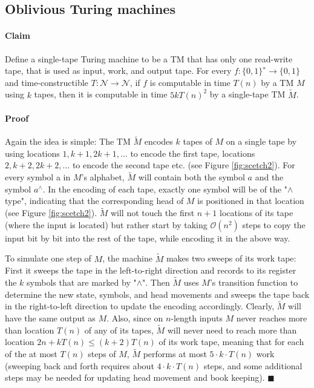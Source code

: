 \documentclass[a4paper,12pt]{article}
\begin{document}
\subsection{Oblivious Turing machines}

\paragraph{Claim}
Define a single-tape Turing machine to be a TM that has only one read-write
tape, that is used as input, work, and output tape. For every $f : \{0, 1\}^{∗} \rightarrow \{0, 1\}$ and
time-constructible $T : \mathcal{N} \rightarrow \mathcal{N}$, if $f$ is computable in time $T(n)$ by a TM $M$ using $k$ tapes,
then it is computable in time $5kT(n)^2$ by a single-tape TM  $\widetilde{M}$.

\paragraph{Proof}
Again the idea is simple: The TM $\widetilde{M}$ encodes $k$ tapes of $M$ on a single
tape by using locations $1, k + 1, 2k + 1, ...$ to encode the first tape, locations $2, k +
2, 2k + 2, ...$ to encode the second tape etc. (see Figure \ref{fig:scetch2}). For every symbol a in
$M$'s alphabet, $\widetilde{M}$ will contain both the symbol $a$ and the symbol $a^\wedge$. In the encoding of
each tape, exactly one symbol will be of the "$\wedge$ type", indicating that the corresponding
head of $M$ is positioned in that location (see Figure \ref{fig:scetch2}). $\widetilde{M}$ will not touch the first
$n + 1$ locations of its tape (where the input is located) but rather start by taking $\mathcal{O}(n^2)$
steps to copy the input bit by bit into the rest of the tape, while encoding it in the
above way.

\par 
To simulate one step of $M$, the machine $\widetilde{M}$ makes two sweeps of its work tape: First it sweeps the tape in the left-to-right direction and records to its register the $k$ symbols
that are marked by "$\wedge$". Then $\widetilde{M}$ uses $M$'s transition function to determine the new state,
symbols, and head movements and sweeps the tape back in the right-to-left direction
to update the encoding accordingly. Clearly, $\widetilde{M}$ will have the same output as $M$. Also,
since on $n$-length inputs $M$ never reaches more than location $T(n)$ of any of its tapes, $\widetilde{M}$ will never need to reach more than location $2n + kT(n) \leq (k + 2)T(n)$ of its work tape,
meaning that for each of the at most $T(n)$ steps of $M$, $\widetilde{M}$ performs at most $5 \cdot k \cdot T(n)$
work (sweeping back and forth requires about $4 \cdot k \cdot T(n)$ steps, and some additional
steps may be needed for updating head movement and book keeping). $\blacksquare$
\end{document}
